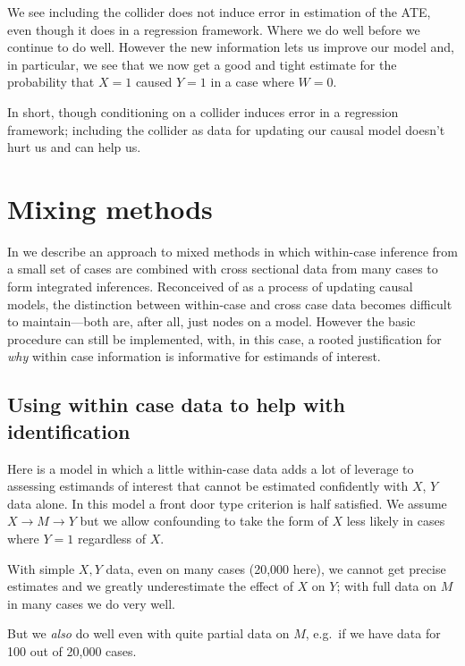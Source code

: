 \documentclass[
  12pt,
]{book}
\begin{document}
We see including the collider does not induce error in estimation of the ATE, even though it does in a regression framework. Where we do well before we continue to do well. However the new information lets us improve our model and, in particular, we see that we now get a good and tight estimate for the probability that \(X=1\) caused \(Y=1\) in a case where \(W=0\).

In short, though conditioning on a collider induces error in a regression framework; including the collider as data for updating our causal model doesn't hurt us and can help us.

\hypertarget{mixing-methods}{%
\chapter{Mixing methods}\label{mixing-methods}}

In \citet{humphreys2015mixing} we describe an approach to mixed methods in which within-case inference from a small set of cases are combined with cross sectional data from many cases to form integrated inferences. Reconceived of as a process of updating causal models, the distinction between within-case and cross case data becomes difficult to maintain---both are, after all, just nodes on a model. However the basic procedure can still be implemented, with, in this case, a rooted justification for \emph{why} within case information is informative for estimands of interest.

\hypertarget{using-within-case-data-to-help-with-identification}{%
\section{Using within case data to help with identification}\label{using-within-case-data-to-help-with-identification}}

Here is a model in which a little within-case data adds a lot of leverage to assessing estimands of interest that cannot be estimated confidently with \(X\), \(Y\) data alone. In this model a front door type criterion is half satisfied. We assume \(X\rightarrow M \rightarrow Y\) but we allow confounding to take the form of \(X\) less likely in cases where \(Y=1\) regardless of \(X\).

With simple \(X,Y\) data, even on many cases (20,000 here), we cannot get precise estimates and we greatly underestimate the effect of \(X\) on \(Y\); with full data on \(M\) in many cases we do very well.

But we \emph{also} do well even with quite partial data on \(M\), e.g.~if we have data for 100 out of 20,000 cases.
\end{document}
